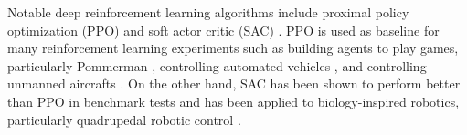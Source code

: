   Notable deep reinforcement learning algorithms include proximal policy optimization (PPO) \cite{schulman2017proximal} and soft actor critic (SAC) \cite{haarnoja2018soft}.
  PPO is used as baseline for many reinforcement learning experiments such as building agents to play games, particularly Pommerman \cite{gao2019skynet}, controlling automated vehicles \cite{guan2020centralized}, and controlling unmanned aircrafts \cite{bohn2019deep}.
  On the other hand, SAC has been shown to perform better than PPO in benchmark tests and has been applied to biology-inspired robotics, particularly quadrupedal robotic control \cite{haarnoja2018softappli}.
